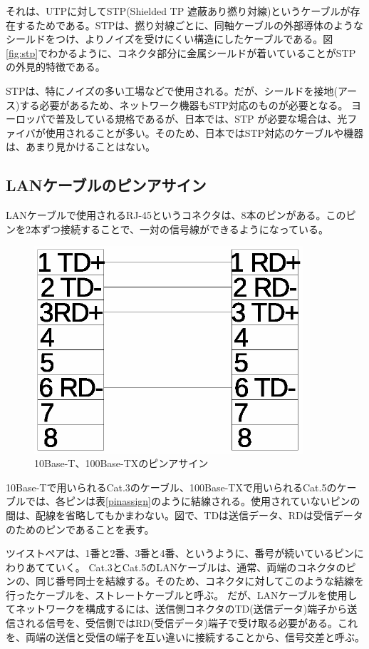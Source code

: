 それは、UTPに対してSTP(Shielded TP 遮蔽あり撚り対線)というケーブルが存在するためである。STPは、撚り対線ごとに、同軸ケーブルの外部導体のようなシールドをつけ、よりノイズを受けにくい構造にしたケーブルである。図\ref{fig:stp}でわかるように、コネクタ部分に金属シールドが着いていることがSTPの外見的特徴である。

STPは、特にノイズの多い工場などで使用される。だが、シールドを接地(アース)する必要があるため、ネットワーク機器もSTP対応のものが必要となる。
ヨーロッパで普及している規格であるが、日本では、STP が必要な場合は、光ファイバが使用されることが多い。そのため、日本ではSTP対応のケーブルや機器は、あまり見かけることはない。

\subsection{LANケーブルのピンアサイン}

LANケーブルで使用されるRJ-45というコネクタは、8本のピンがある。このピンを2本ずつ接続することで、一対の信号線ができるようになっている。

\begin{figure}[htbp]
	\includegraphics[width=10cm,clip]{draw/cat5pin.eps}
	\caption{10Base-T、100Base-TXのピンアサイン}
	\label{fig:pinassign}
\end{figure}

10Base-Tで用いられるCat.3のケーブル、100Base-TXで用いられるCat.5のケーブルでは、各ピンは表\ref{pinassign}のように結線される。使用されていないピンの間は、配線を省略してもかまわない。図で、TDは送信データ、RDは受信データのためのピンであることを表す。

ツイストペアは、1番と2番、3番と4番、というように、番号が続いているピンにわりあてていく。
Cat.3とCat.5のLANケーブルは、通常、両端のコネクタのピンの、同じ番号同士を結線する。そのため、コネクタに対してこのような結線を行ったケーブルを、ストレートケーブルと呼ぶ。
だが、LANケーブルを使用してネットワークを構成するには、送信側コネクタのTD(送信データ)端子から送信される信号を、受信側ではRD(受信データ)端子で受け取る必要がある。これを、両端の送信と受信の端子を互い違いに接続することから、信号交差と呼ぶ。

